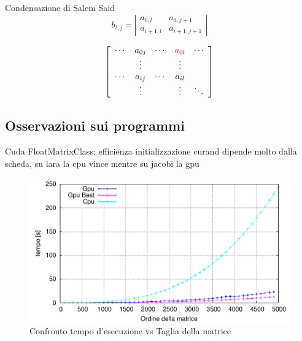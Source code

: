 \documentclass{article}
\begin{document}
Condensazione di Salem Said
\begin{displaymath}
b_{i,j} =
\left| \begin{array}{cc} a_{0,l} & a_{0,j+1}  \\ a_{i+1 , l} & a_{i+1 , j+1}  \end{array} \right| 
\end{displaymath}

\begin{displaymath}
	\left[ \begin{array}{ccccc} 
		\cdots & a_{0j} & \cdots & \color{red}a_{0l} & \cdots  \\ 
		 & \vdots &  & \vdots &  \\ 
		\cdots & \color{blue}a_{ij} & \cdots & a_{il}  & \\
		& \vdots &  & \vdots & \ddots
	\end{array} \right] 
\end{displaymath}



\subsection{Osservazioni sui programmi}
Cuda FloatMatrixClass: efficienza initializzazione curand dipende molto dalla scheda, su lara la cpu vince mentre su jacobi la gpu


\begin{figure}[ht!]
	\centering
	\includegraphics[width=180mm]{TimevsN.pdf}
	\caption{Confronto tempo d'esecuzione vs Taglia della matrice}
	\label{TimevsN}
\end{figure}
\end{document}
